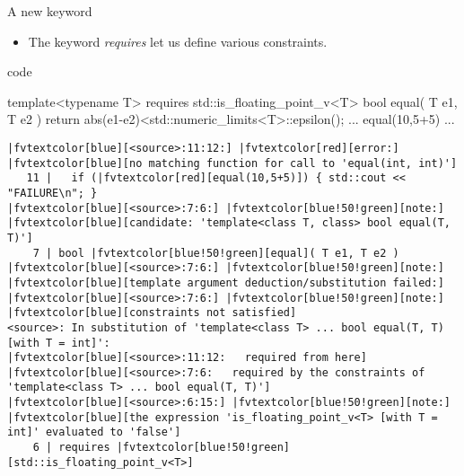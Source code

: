 \begin{frame}[fragile]
  \begin{block}{A new keyword}
    \begin{itemize}
      \item The keyword {\it requires} let us define various constraints.
    \end{itemize}
  \end{block}
  \begin{exampleblock}{ code}
    \scriptsize
    \begin{cppcode*}{}
    template<typename T>
    requires std::is_floating_point_v<T>
    bool equal( T e1, T e2 ) {
      return abs(e1-e2)<std::numeric_limits<T>::epsilon();
    }
    ... equal(10,5+5) ...
    \end{cppcode*}
    \pause
    \tiny
    \begin{Verbatim}[commandchars=\|\[\]]
|fvtextcolor[blue][<source>:11:12:] |fvtextcolor[red][error:] |fvtextcolor[blue][no matching function for call to 'equal(int, int)']
   11 |   if (|fvtextcolor[red][equal(10,5+5)]) { std::cout << "FAILURE\n"; }
|fvtextcolor[blue][<source>:7:6:] |fvtextcolor[blue!50!green][note:] |fvtextcolor[blue][candidate: 'template<class T, class> bool equal(T, T)']
    7 | bool |fvtextcolor[blue!50!green][equal]( T e1, T e2 )
|fvtextcolor[blue][<source>:7:6:] |fvtextcolor[blue!50!green][note:]   |fvtextcolor[blue][template argument deduction/substitution failed:]
|fvtextcolor[blue][<source>:7:6:] |fvtextcolor[blue!50!green][note:] |fvtextcolor[blue][constraints not satisfied]
<source>: In substitution of 'template<class T> ... bool equal(T, T) [with T = int]':
|fvtextcolor[blue][<source>:11:12:   required from here]
|fvtextcolor[blue][<source>:7:6:   required by the constraints of 'template<class T> ... bool equal(T, T)']
|fvtextcolor[blue][<source>:6:15:] |fvtextcolor[blue!50!green][note:] |fvtextcolor[blue][the expression 'is_floating_point_v<T> [with T = int]' evaluated to 'false']
    6 | requires |fvtextcolor[blue!50!green][std::is_floating_point_v<T>]
    \end{Verbatim}
  \end{exampleblock}
\end{frame}

